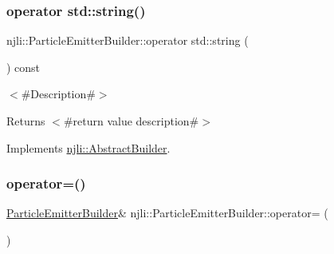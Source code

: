 \subsubsection{\texorpdfstring{operator std\+::string()}{operator std::string()}}
{\footnotesize\ttfamily njli\+::\+Particle\+Emitter\+Builder\+::operator std\+::string (\begin{DoxyParamCaption}{ }\end{DoxyParamCaption}) const\hspace{0.3cm}{\ttfamily [virtual]}}

$<$\#\+Description\#$>$

\begin{DoxyReturn}{Returns}
$<$\#return value description\#$>$ 
\end{DoxyReturn}


Implements \mbox{\hyperlink{classnjli_1_1_abstract_builder_a3e6e553e06d1ca30517ad5fb0bd4d000}{njli\+::\+Abstract\+Builder}}.

\mbox{\label{classnjli_1_1_particle_emitter_builder_a5185f10888f76abc77fecbca032dcd7a}} 
\subsubsection{\texorpdfstring{operator=()}{operator=()}}
{\footnotesize\ttfamily \mbox{\hyperlink{classnjli_1_1_particle_emitter_builder}{Particle\+Emitter\+Builder}}\& njli\+::\+Particle\+Emitter\+Builder\+::operator= (\begin{DoxyParamCaption}\item[{const \mbox{\hyperlink{classnjli_1_1_particle_emitter_builder}{Particle\+Emitter\+Builder}} \&}]{ }\end{DoxyParamCaption})\hspace{0.3cm}{\ttfamily [protected]}}

\mbox{\label{classnjli_1_1_particle_emitter_builder_a1e39254273d34724cabbae7a118ad9a4}} 
